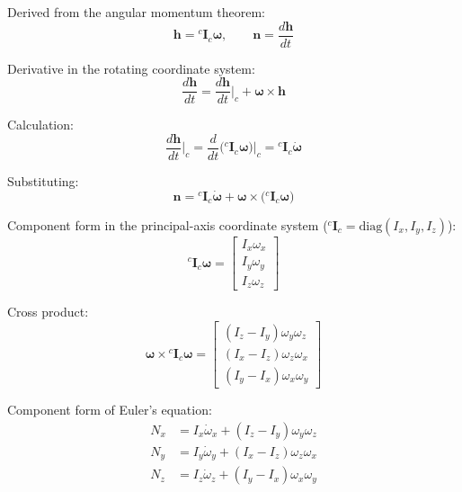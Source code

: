 \documentclass[12pt,a4paper]{report}
\newcommand{\vect}[1]{\mathbf{#1}}
\newcommand{\mat}[1]{\mathbf{#1}}
\newcommand{\angvel}{\boldsymbol{\omega}}
\begin{document}
Derived from the angular momentum theorem:
\begin{equation}
\vect{h} = {}^{c}\mat{I}_{c}\angvel,
\qquad
\vect{n} = \frac{d\vect{h}}{dt}
\end{equation}

Derivative in the rotating coordinate system:
\begin{equation}
\frac{d\vect{h}}{dt}
=
\frac{d\vect{h}}{dt}\Big|_{c}
+
\angvel \times \vect{h}
\end{equation}

Calculation:
\begin{equation}
\frac{d\vect{h}}{dt}\Big|_{c}
=
\frac{d}{dt}\bigl({}^{c}\mat{I}_{c}\angvel\bigr)\Big|_{c}
=
{}^{c}\mat{I}_{c}\dot{\angvel}
\end{equation}

Substituting:
\begin{equation}
\vect{n}
=
{}^{c}\mat{I}_{c}\dot{\angvel}
+
\angvel \times \bigl({}^{c}\mat{I}_{c}\angvel\bigr)
\end{equation}

Component form in the principal-axis coordinate system (${ }^{c}\mat{I}_{c} = \mathrm{diag}(I_{x}, I_{y}, I_{z})$):
\begin{equation}
{}^{c}\mat{I}_{c}\angvel
=
\begin{bmatrix}
I_{x}\omega_{x} \\
I_{y}\omega_{y} \\
I_{z}\omega_{z}
\end{bmatrix}
\end{equation}

Cross product:
\begin{equation}
\angvel \times {}^{c}\mat{I}_{c}\angvel
=
\begin{bmatrix}
(I_{z} - I_{y})\omega_{y}\omega_{z} \\
(I_{x} - I_{z})\omega_{z}\omega_{x} \\
(I_{y} - I_{x})\omega_{x}\omega_{y}
\end{bmatrix}
\end{equation}

Component form of Euler's equation:
\begin{align}
N_{x} &= I_{x}\dot{\omega}_{x} + (I_{z} - I_{y})\omega_{y}\omega_{z} \\
N_{y} &= I_{y}\dot{\omega}_{y} + (I_{x} - I_{z})\omega_{z}\omega_{x} \\
N_{z} &= I_{z}\dot{\omega}_{z} + (I_{y} - I_{x})\omega_{x}\omega_{y}
\end{align}
\end{document}
